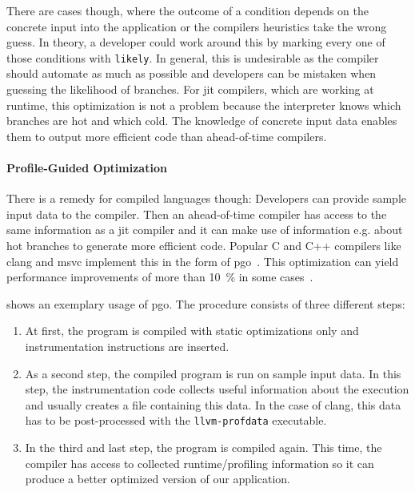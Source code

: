 There are cases though, where the outcome of a condition depends on the concrete input into the application or the compilers heuristics take the wrong guess. In theory, a developer could work around this by marking every one of those conditions with \texttt{likely}. In general, this is undesirable as the compiler should automate as much as possible and developers can be mistaken when guessing the likelihood of branches.
For \gls{jit} compilers, which are working at runtime, this optimization is not a problem because the interpreter knows which branches are hot and which cold. The knowledge of concrete input data enables them to output more efficient code than ahead-of-time compilers.

\paragraph{Profile-Guided Optimization} There is a remedy for compiled languages though: Developers can provide sample input data to the compiler.
Then an ahead-of-time compiler has access to the same information as a \gls{jit} compiler and it can make use of information e.g. about hot branches to generate more efficient code.
Popular C and C++ compilers like clang and msvc implement this in the form of \gls{pgo}~\cite{ClangManual, MicrosoftPgo}.
This optimization can yield performance improvements of more than \SI{10}{\percent} in some cases~\cite{LarabelPgo2018}.

 shows an exemplary usage of \gls{pgo}. The procedure consists of three different steps:
\begin{enumerate}
	\item At first, the program is compiled with static optimizations only and instrumentation instructions are inserted.
	\item As a second step, the compiled program is run on sample input data. In this step, the instrumentation code collects useful information about the execution and usually creates a file containing this data. In the case of clang, this data has to be post-processed with the \texttt{llvm-profdata} executable.
	\item In the third and last step, the program is compiled again. This time, the compiler has access to collected runtime/profiling information so it can produce a better optimized version of our application.
\end{enumerate}



